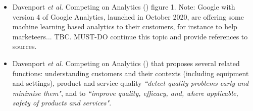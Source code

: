 \begin{itemize}



    \item Davenport \textit{et al.} Competing on Analytics (\cite{davenport2017competing_on_analytics}) figure 1. Note: Google with version 4 of Google Analytics, launched in October 2020, are offering some machine learning based analytics to their customers, for instance to help marketeers... TBC. MUST-DO continue this topic and provide references to sources.
    
    \item Davenport \textit{et al.} Competing on Analytics (\cite{davenport2006competing_on_analytics}) that proposes several related functions: understanding customers and their contexts (including equipment and settings), product and service quality \emph{``detect quality problems early and minimise them"}, and to \emph{``improve quality, efficacy, and, where applicable, safety of products and services"}.
    

\end{itemize}
